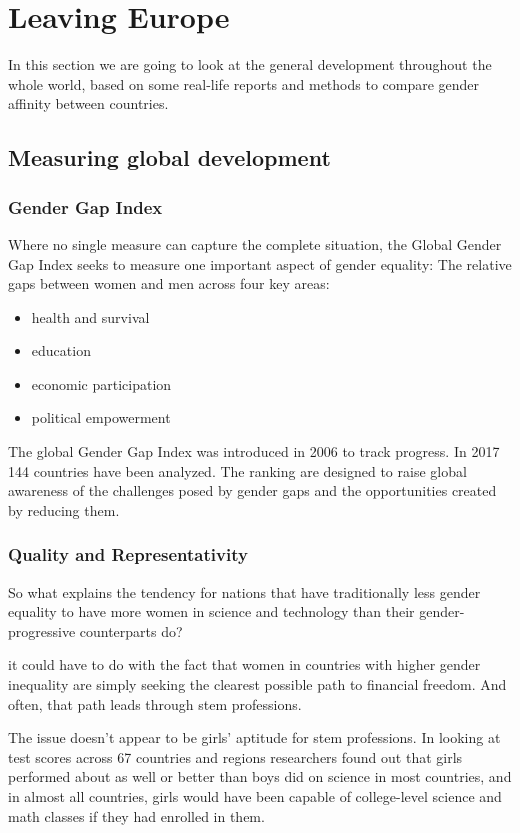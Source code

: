 	\section{Leaving Europe}
	In this section we are going to look at the general development throughout the whole world, based on some real-life reports and methods to compare gender affinity between countries.
	
	\subsection{Measuring global development}
	
	\subsubsection{Gender Gap Index}
	
	Where no single measure can capture the complete situation, the Global Gender Gap Index seeks to measure one important aspect of gender equality: The relative gaps between women and men across four key areas:
	\begin{itemize}
		\item health and survival
		\item education
		\item economic participation
		\item political empowerment
	\end{itemize}
	The global Gender Gap Index was introduced in 2006 to track progress. In 2017 144 countries have been analyzed. 
	The ranking are designed to raise global awareness of the challenges posed by gender gaps and the opportunities created by reducing them. \cite{tafrica1} \cite{tchina1} \cite{tusa1} \cite{tgender}
	
	\subsubsection{Quality and Representativity}
	
	So what explains the tendency for nations that have traditionally less gender equality to have more women in science and technology than their gender-progressive counterparts do?
	
	it could have to do with the fact that women in countries with higher gender inequality are simply seeking the clearest possible path to financial freedom. And often, that path leads through stem professions.
	
	The issue doesn’t appear to be girls’ aptitude for stem professions. In looking at test scores across 67 countries and regions researchers found out that girls performed about as well or better than boys did on science in most countries, and in almost all countries, girls would have been capable of college-level science and math classes if they had enrolled in them.
	
